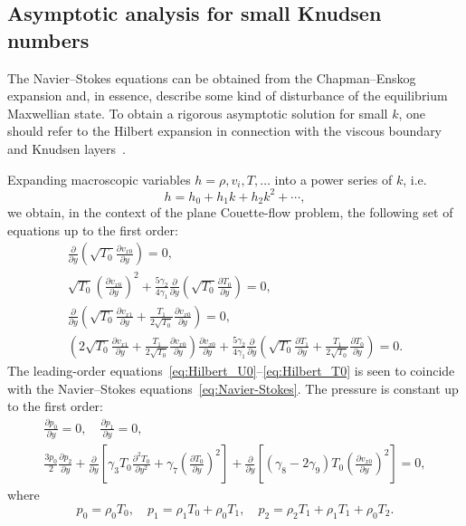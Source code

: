 \documentclass[review]{elsarticle}
\newcommand{\pder}[2][]{\frac{\partial#1}{\partial#2}}
\newcommand{\pderdual}[2][]{\frac{\partial^2#1}{\partial#2^2}}
\begin{document}
\subsection{Asymptotic analysis for small Knudsen numbers}

The Navier--Stokes equations can be obtained from the Chapman--Enskog expansion
and, in essence, describe some kind of disturbance of the equilibrium Maxwellian state.
To obtain a rigorous asymptotic solution for small \(k\),
one should refer to the Hilbert expansion in connection with the
viscous boundary and Knudsen layers~\citep{Sone2000, Sone2002}.

Expanding macroscopic variables \(h = \rho, v_i, T, \dots\) into a power series of \(k\), i.e.
\begin{equation}\label{eq:hilbert_expansion}
    h = h_0 + h_1k + h_2k^2 + \cdots,
\end{equation}
we obtain, in the context of the plane Couette-flow problem, the following set of equations up to the first order:
\begin{gather}
    \pder{y}\left( \sqrt{T_0}\pder[v_{x0}]{y} \right) = 0, \label{eq:Hilbert_U0}\\
    \sqrt{T_0}\left( \pder[v_{x0}]{y}\right)^2 + \frac{5\gamma_2}{4\gamma_1}\pder{y}\left(\sqrt{T_0}\pder[T_0]{y} \right) = 0, \label{eq:Hilbert_T0}\\
    \pder{y}\left( \sqrt{T_0}\pder[v_{x1}]{y} + \frac{T_1}{2\sqrt{T_0}}\pder[v_{x0}]{y} \right) = 0, \label{eq:Hilbert_U1}\\
    \left( 2\sqrt{T_0}\pder[v_{x1}]{y} + \frac{T_1}{2\sqrt{T_0}}\pder[v_{x0}]{y} \right) \pder[v_{x0}]{y}
        + \frac{5\gamma_2}{4\gamma_1} \pder{y}\left( \sqrt{T_0}\pder[T_1]{y} + \frac{T_1}{2\sqrt{T_0}}\pder[T_0]{y} \right) = 0. \label{eq:Hilbert_T1}
\end{gather}
The leading-order equations~\eqref{eq:Hilbert_U0}--\eqref{eq:Hilbert_T0}
is seen to coincide with the Navier--Stokes equations~\eqref{eq:Navier-Stokes}.
The pressure is constant up to the first order:
\begin{gather}
    \pder[p_0]{y} = 0, \quad \pder[p_1]{y} = 0, \label{eq:hilbert_p0_p1} \\
    \frac{3p_0}{2}\pder[p_2]{y}
        + \pder{y}\left[ \gamma_3 T_0 \pderdual[T_0]{y} + \gamma_7\left(\pder[T_0]{y}\right)^2 \right]
        + \pder{y}\left[ (\gamma_8-2\gamma_9)T_0\left(\pder[v_{x0}]{y}\right)^2 \right] = 0, \label{eq:hilbert_p2}
\end{gather}
where
\begin{equation}\label{eq:hilbert_expansion_p}
    p_0 = \rho_0 T_0, \quad
    p_1 = \rho_1 T_0 + \rho_0 T_1, \quad
    p_2 = \rho_2 T_1 + \rho_1 T_1 + \rho_0 T_2.
\end{equation}
\end{document}

